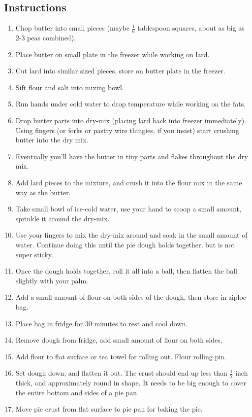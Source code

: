 \begin{multicols}{2}
\subsection*{Instructions}
\begin{enumerate}
    \item Chop butter into small pieces (maybe \( \frac{1}{6} \) tablespoon squares, about as big as 2-3 peas combined).
    \item Place butter on small plate in the freezer while working on lard.
    \item Cut lard into similar sized pieces, store on butter plate in the freezer.
    \item Sift flour and salt into mixing bowl.
    \item Run hands under cold water to drop temperature while working on the fats.
    \item Drop butter parts into dry-mix (placing lard back into freezer immediately). Using fingers (or forks or pastry wire thingies, if you insist) start crushing butter into the dry mix.
    \item Eventually you’ll have the butter in tiny parts and flakes throughout the dry mix.
    \item Add lard pieces to the mixture, and crush it into the flour mix in the same way as the butter.
    \item Take small bowl of ice-cold water, use your hand to scoop a small amount, sprinkle it around the dry-mix.
    \item Use your fingers to mix the dry-mix around and soak in the small amount of water. Continue doing this until the pie dough holds together, but is not super sticky.
    \item Once the dough holds together, roll it all into a ball, then flatten the ball slightly with your palm.
    \item Add a small amount of flour on both sides of the dough, then store in ziploc bag.
    \item Place bag in fridge for 30 minutes to rest and cool down.
    \item Remove dough from fridge, add small amount of flour on both sides.
    \item Add flour to flat surface or tea towel for rolling out. Flour rolling pin.
    \item Set dough down, and flatten it out. The crust should end up less than \( \frac{1}{2} \) inch thick, and approximately round in shape. It needs to be big enough to cover the entire bottom and sides of a pie pan.
    \item Move pie crust from flat surface to pie pan for baking the pie.


\end{enumerate}
\end{multicols}
